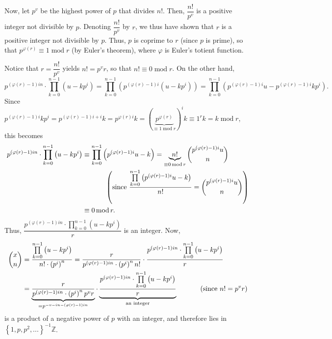 \documentclass[numbers=enddot,12pt,final,onecolumn,notitlepage]{scrartcl}%
\begin{document}
Now, let $p^{v}$ be the highest power of $p$ that divides $n!$. Then,
$\dfrac{n!}{p^{v}}$ is a positive integer not divisible by $p$. Denoting
$\dfrac{n!}{p^{v}}$ by $r$, we thus have shown that $r$ is a positive integer
not divisible by $p$. Thus, $p$ is coprime to $r$ (since $p$ is prime), so
that $p^{\varphi\left(  r\right)  }\equiv1\operatorname{mod}r$ (by Euler's
theorem), where $\varphi$ is Euler's totient function.

Notice that $r=\dfrac{n!}{p^{v}}$ yields $n!=p^{v}r$, so that $n!\equiv
0\operatorname{mod}r$. On the other hand,%
\[
p^{\left(  \varphi\left(  r\right)  -1\right)  in}\cdot\prod\limits_{k=0}%
^{n-1}\left(  u-kp^{i}\right)  =\prod\limits_{k=0}^{n-1}\left(  p^{\left(
\varphi\left(  r\right)  -1\right)  i}\left(  u-kp^{i}\right)  \right)
=\prod\limits_{k=0}^{n-1}\left(  p^{\left(  \varphi\left(  r\right)
-1\right)  i}u-p^{\left(  \varphi\left(  r\right)  -1\right)  i}kp^{i}\right)
.
\]
Since $p^{\left(  \varphi\left(  r\right)  -1\right)  i}kp^{i}=p^{\left(
\varphi\left(  r\right)  -1\right)  i+i}k=p^{\varphi\left(  r\right)
i}k=\left(  \underbrace{p^{\varphi\left(  r\right)  }}_{\equiv
1\operatorname{mod}r}\right)  ^{i}k\equiv1^{r}k=k\operatorname{mod}r$, this
becomes%
\begin{align*}
p^{\left(  \varphi\left(  r\right)  -1\right)  in}\cdot\prod\limits_{k=0}%
^{n-1}\left(  u-kp^{i}\right)   &  \equiv\prod\limits_{k=0}^{n-1}\left(
p^{\left(  \varphi\left(  r\right)  -1\right)  i}u-k\right)  =\underbrace{n!}%
_{\equiv0\operatorname{mod}r}\dbinom{p^{\left(  \varphi\left(  r\right)
-1\right)  i}u}{n}\\
&  \ \ \ \ \ \ \ \ \ \ \left(  \text{since }\dfrac{\prod\limits_{k=0}%
^{n-1}\left(  p^{\left(  \varphi\left(  r\right)  -1\right)  i}u-k\right)
}{n!}=\dbinom{p^{\left(  \varphi\left(  r\right)  -1\right)  i}u}{n}\right) \\
&  \equiv0\operatorname{mod}r.
\end{align*}
Thus, $\dfrac{p^{\left(  \varphi\left(  r\right)  -1\right)  in}\cdot
\prod\limits_{k=0}^{n-1}\left(  u-kp^{i}\right)  }{r}$ is an integer. Now,%
\begin{align*}
\dbinom{x}{n}  &  =\dfrac{\prod\limits_{k=0}^{n-1}\left(  u-kp^{i}\right)
}{n!\cdot\left(  p^{i}\right)  ^{n}}=\dfrac{r}{p^{\left(  \varphi\left(
r\right)  -1\right)  in}\cdot\left(  p^{i}\right)  ^{n}n!}\cdot\dfrac
{p^{\left(  \varphi\left(  r\right)  -1\right)  in}\cdot\prod\limits_{k=0}%
^{n-1}\left(  u-kp^{i}\right)  }{r}\\
&  =\underbrace{\dfrac{r}{p^{\left(  \varphi\left(  r\right)  -1\right)
in}\cdot\left(  p^{i}\right)  ^{n}p^{v}r}}_{=p^{-v-in-\left(  \varphi\left(
r\right)  -1\right)  in}}\cdot\underbrace{\dfrac{p^{\left(  \varphi\left(
r\right)  -1\right)  in}\cdot\prod\limits_{k=0}^{n-1}\left(  u-kp^{i}\right)
}{r}}_{\text{an integer}}\ \ \ \ \ \ \ \ \ \ \left(  \text{since }%
n!=p^{v}r\right)
\end{align*}
is a product of a negative power of $p$ with an integer, and therefore lies in
$\left\{  1,p,p^{2},...\right\}  ^{-1}\mathbb{Z}$.
\end{document}
